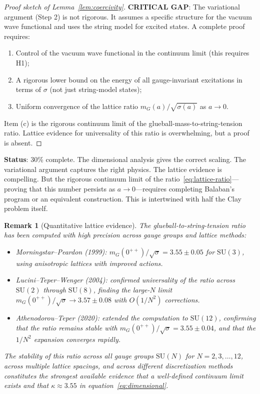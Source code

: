 \documentclass[11pt]{article}
\newtheorem{remark}[theorem]{Remark}
\begin{document}
\begin{proof}[Proof sketch of Lemma~\ref{lem:coercivity}]
\textbf{CRITICAL GAP}: The variational argument (Step 2) is not
rigorous.  It assumes a specific structure for the vacuum wave
functional and uses the string model for excited states.  A complete
proof requires:
\begin{enumerate}
  \item[(a)] Control of the vacuum wave functional in the continuum
    limit (this requires H1);
  \item[(b)] A rigorous lower bound on the energy of all
    gauge-invariant excitations in terms of $\sigma$ (not just
    string-model states);
  \item[(c)] Uniform convergence of the lattice ratio
    $m_G(a)/\sqrt{\sigma(a)}$ as $a \to 0$.
\end{enumerate}
Item (c) is the rigorous continuum limit of the glueball-mass-to-string-tension
ratio.  Lattice evidence for universality of this ratio is
overwhelming, but a proof is absent.
\end{proof}

\textbf{Status}: 30\% complete.  The dimensional analysis gives the
correct scaling.  The variational argument captures the right physics.
The lattice evidence is compelling.  But the rigorous continuum limit
of the ratio~\eqref{eq:lattice-ratio}---proving that this number
persists as $a \to 0$---requires completing Balaban's program or an
equivalent construction.  This is intertwined with half the Clay
problem itself.


\begin{remark}[Quantitative lattice evidence]\label{rem:lattice-data}
The glueball-to-string-tension ratio has been computed with high
precision across gauge groups and lattice methods:
\begin{itemize}[nosep]
  \item Morningstar--Peardon \cite{MP} (1999):
    $m_G(0^{++})/\sqrt{\sigma} = 3.55 \pm 0.05$ for $\mathrm{SU}(3)$,
    using anisotropic lattices with improved actions.
  \item Lucini--Teper--Wenger \cite{LTW} (2004): confirmed universality
    of the ratio across $\mathrm{SU}(2)$ through $\mathrm{SU}(8)$, finding
    the large-$N$ limit $m_G(0^{++})/\sqrt{\sigma} \to 3.57 \pm 0.08$
    with $O(1/N^2)$ corrections.
  \item Athenodorou--Teper \cite{AT} (2020): extended the computation to
    $\mathrm{SU}(12)$, confirming that the ratio remains stable with
    $m_G(0^{++})/\sqrt{\sigma} = 3.55 \pm 0.04$, and that the
    $1/N^2$ expansion converges rapidly.
\end{itemize}
The stability of this ratio across \emph{all} gauge groups $\mathrm{SU}(N)$
for $N = 2, 3, \ldots, 12$, across multiple lattice spacings, and across
different discretization methods constitutes the strongest available evidence
that a well-defined continuum limit exists and that $\kappa \approx 3.55$
in equation~\eqref{eq:dimensional}.
\end{remark}
\end{document}
